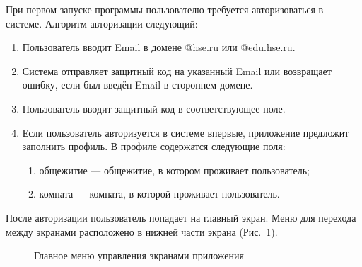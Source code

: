 \documentclass{../includes/TechDoc}
\begin{document}
    При первом запуске программы пользователю требуется авторизоваться в системе.
    Алгоритм авторизации следующий:
    \begin{enumerate}
        \item Пользователь вводит Email в домене @hse.ru или @edu.hse.ru.
        \item Система отправляет защитный код на указанный Email или возвращает ошибку, если был введён Email в стороннем домене.
        \item Пользователь вводит защитный код в соответствующее поле.
        \item Если пользователь авторизуется в системе впервые, приложение предложит заполнить профиль.
        В профиле содержатся следующие поля:
        \begin{enumerate}
            \item общежитие — общежитие, в котором проживает пользователь;
            \item комната — комната, в которой проживает пользователь.
        \end{enumerate}
    \end{enumerate}

    После авторизации пользователь попадает на главный экран.
    Меню для перехода между экранами расположено в нижней части экрана (Рис.~\ref{ris:menu}).

    \begin{figure}[ht]
        \centering
        \caption{Главное меню управления экранами приложения}
        \label{ris:menu}
    \end{figure}
\end{document}
